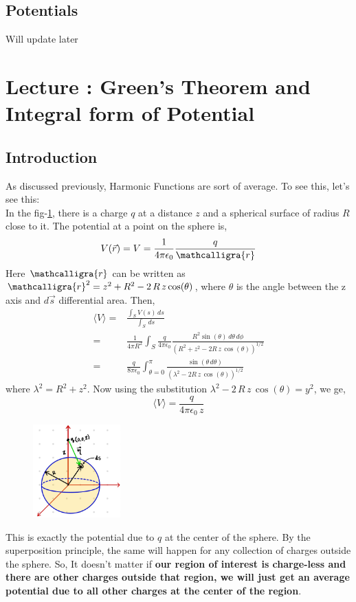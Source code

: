\documentclass{article}
\newcommand{\scriptr}{\mathord{\mathcalligra{r}}}
\newcommand{\lecture}[1]{
  \section{Lecture \thesection: #1}
}
\begin{document}
\subsection{Potentials}
Will update later
\lecture{Green's Theorem and Integral form of Potential}
\subsection{Introduction}
As discussed previously, Harmonic Functions are sort of average. To see this, let's see this:\\
In the fig-\ref{sp_av_cen}, there is a charge $q$ at a distance $z$ and a spherical surface of radius $R$ close to it. The potential at a point on the sphere is,
\begin{equation*}
    V(\vec{r})=V = \frac{1}{4\pi \epsilon_0}\frac{q}{\scriptr}
\end{equation*}
Here $\scriptr$ can be written as $\scriptr^2=z^2 + R^2 -2\, R\, z \cos(\theta)$, where $\theta$ is the angle between the z axis and $d\vec{s}$ differential area. Then,
\begin{equation}
    \begin{split}
        \langle V\rangle = & \frac{\int_S V(s)\, ds}{\int_S \,ds}\\
                        = & \frac{1}{4\pi R^2}\int_S \frac{q}{4\pi \epsilon_0} \frac{R^2 \sin(\theta)\, d\theta \, d\phi}{(R^2 + z^2 -2R\, z \, \cos(\theta))^{1/2}}\\
                        = & \frac{q}{8\pi \epsilon_0}\int_{\theta = 0}^{\pi} \frac{\sin(\theta\, d\theta)}{(\lambda^2 - 2R\, z\, \cos(\theta))^{1/2}}
    \end{split}
\end{equation}
where $\lambda^2=R^2+z^2$. Now using the substitution $\lambda^2-2\, R\, z\, \cos(\theta)=y^2$, we ge,
\begin{equation}
    \langle V\rangle = \frac{q}{4\pi \epsilon_0 \, z}
\end{equation} 
\begin{figure}[H]
\centering
\includegraphics[width=0.3\textwidth]{Images/sp_av_cen.jpeg}
\caption{}
\label{sp_av_cen}
\end{figure}
This is exactly the potential due to $q$ at the center of the sphere. By the superposition principle, the same will happen for any collection of charges outside the sphere. So, It doesn't matter if \textbf{our region of interest is charge-less and there are other charges outside that region, we will just get an average potential due to all other charges at the center of the region}.
\end{document}
